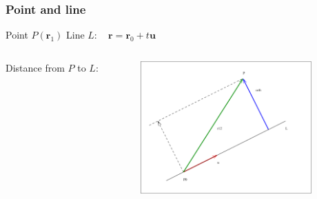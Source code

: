 \begin{frame}
  \frametitle{Point and line}
  Point $P(\textbf{r}_1)$ \hspace{2cm} Line $L: \quad \textbf{r}=\textbf{r}_0+t\textbf{u}$

  \begin{columns}
  \column{6cm}
  \textcolor[rgb]{0.98,0.00,0.00}{Distance} from $P$ to $L$:
  \column{6.5cm}
      \begin{figure}
        \includegraphics[height=2in]{../../modules/vectors/pictures/ok-distance_point_line.eps}
    \end{figure}
    \end{columns}
\end{frame}